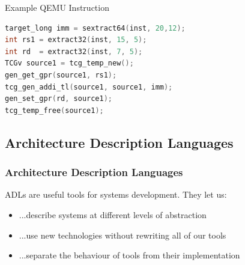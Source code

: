 \begin{frame}[fragile]{Example QEMU Instruction}
\begin{lstlisting}[language=C]
target_long imm = sextract64(inst, 20,12);
int rs1 = extract32(inst, 15, 5);
int rd  = extract32(inst, 7, 5);
TCGv source1 = tcg_temp_new();
gen_get_gpr(source1, rs1);
tcg_gen_addi_tl(source1, source1, imm);
gen_set_gpr(rd, source1);
tcg_temp_free(source1);
\end{lstlisting}
\end{frame}

\subsection{Architecture Description Languages}

\begin{frame}
\frametitle{Architecture Description Languages}

ADLs are useful tools for systems development. They let us:
\begin{itemize}
	\item<2-> ...describe systems at different levels of abstraction
	\item<3-> ...use new technologies without rewriting all of our tools
	\item<4-> ...separate the behaviour of tools from their implementation
\end{itemize}

\bigskip

\centering
{}

\end{frame}

